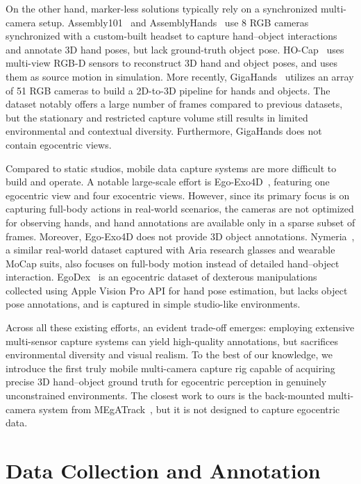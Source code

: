 \documentclass[10pt,twocolumn,letterpaper]{article}
\begin{document}
On the other hand, marker-less solutions typically rely on a synchronized multi-camera setup.
Assembly101~\cite{sener2022assembly101} and 
AssemblyHands~\cite{ohkawa2023assemblyhands} use 8 RGB cameras synchronized with a custom-built headset to capture hand–object interactions and annotate 3D hand poses, but lack ground-truth object pose. 
HO-Cap~\cite{wang2024hocapcapturedataset3d} uses multi-view RGB-D sensors to reconstruct 3D hand and object poses, and uses them as source motion in simulation.
More recently, GigaHands~\cite{fu2025gigahands} 
utilizes an array of 51 RGB cameras to build a 2D-to-3D pipeline for hands and objects.
The dataset notably offers a large number of frames compared to previous datasets,
but the stationary and restricted capture volume still results in  limited environmental and contextual diversity.
Furthermore, GigaHands does not contain egocentric views. 

Compared to static studios, mobile data capture systems are more difficult to build and operate.
A notable large-scale effort is Ego-Exo4D~\cite{grauman2024ego}, featuring one egocentric view and four exocentric views. However, since its primary focus is on capturing full-body actions in real-world scenarios, the cameras are not optimized for observing hands, and hand annotations are available only in a sparse subset of frames. Moreover, Ego-Exo4D does not provide 3D object annotations.
Nymeria~\cite{ma2024nymeria}, a similar real-world dataset captured with Aria research glasses and wearable MoCap suits, also focuses on full-body motion instead of detailed hand–object interaction. 
EgoDex~\cite{hoque2025egodexlearningdexterousmanipulation} is an egocentric dataset of dexterous manipulations collected using Apple Vision Pro API for hand pose estimation, but lacks object pose annotations, and is captured in simple studio-like environments.

Across all these existing efforts, an evident trade-off emerges: employing extensive multi-sensor capture systems can yield high-quality annotations, but sacrifices environmental diversity and visual realism.
To the best of our knowledge, we introduce the first truly mobile multi-camera capture rig capable of acquiring precise 3D hand–object ground truth for egocentric perception in genuinely unconstrained environments.
The closest work to ours is the back-mounted multi-camera system from MEgATrack~\cite{han2020megatrack}, but it is not designed to capture egocentric data.



\section{Data Collection and Annotation}
\end{document}
